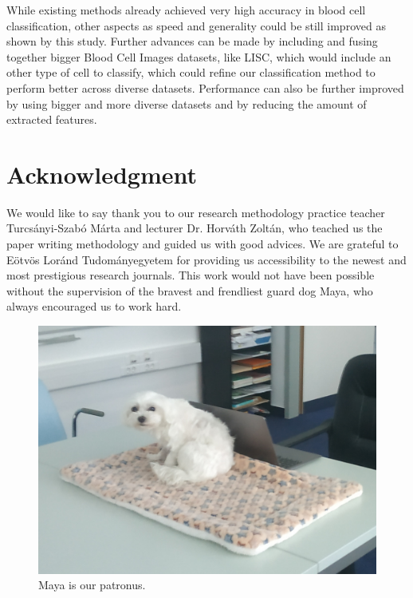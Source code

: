 \documentclass[conference]{IEEEtran}
\begin{document}
While existing methods already achieved very high accuracy in blood cell classification, other aspects as speed and generality could be still improved as shown by this study. 
Further advances can be made by including and fusing together bigger Blood Cell Images datasets, like LISC, which would include an other type of cell to classify, which could refine our classification method to perform better across diverse datasets.
Performance can also be further improved by using bigger and more diverse datasets and by reducing the
amount of extracted features.

\section*{Acknowledgment}

We would like to say thank you to our research methodology practice teacher Turcsányi-Szabó Márta and lecturer Dr. Horváth Zoltán, who teached us the paper writing methodology and guided us with good advices.
We are grateful to Eötvös Loránd Tudományegyetem for providing us accessibility to the newest and most prestigious research journals.
This work would not have been possible without the supervision of the bravest and frendliest guard dog Maya, who always encouraged us to work hard.

\begin{figure}[htbp]
    \begin{center}
    \includegraphics[scale=0.16]{IMG_20221019_165459.jpg}
    \end{center}
    \caption{Maya is our patronus.}
\end{figure}
\end{document}
